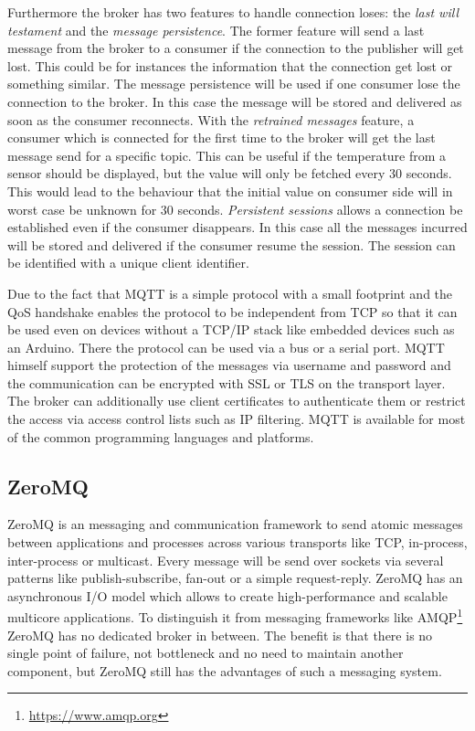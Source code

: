 Furthermore the broker has two features to handle connection loses: the \textit{last will testament} and the \textit{message persistence}.
The former feature will send a last message from the broker to a consumer if the connection to the publisher will get lost.
This could be for instances the information that the connection get lost or something similar.
The message persistence will be used if one consumer lose the connection to the broker.
In this case the message will be stored and delivered as soon as the consumer reconnects.
With the \textit{retrained messages} feature, a consumer which is connected for the first time to the broker will get the last message send for a specific topic. This can be useful if the temperature from a sensor should be displayed, but the value will only be fetched every 30 seconds. This would lead to the behaviour that the initial value on consumer side will in worst case be unknown for 30 seconds.
\textit{Persistent sessions} allows a connection be established even if the consumer disappears. In this case all the messages incurred will be stored and delivered if the consumer resume the session. The session can be identified with a unique client identifier.\autocite[cf.]{Bayer:MQTT}

Due to the fact that \ac{MQTT} is a simple protocol with a small footprint and the \ac{QoS} handshake enables the protocol to be independent from \acs{TCP} so that it can be used even on devices without a TCP/IP stack like embedded devices such as an Arduino.\autocite[cf.]{Bayer:MQTT}
There the protocol can be used via a bus or a serial port.\autocite[cf.]{Bayer:MQTT}
\ac{MQTT} himself support the protection of the messages via username and password and the communication can be encrypted with \acs{SSL} or \acs{TLS} on the transport layer.\autocite[cf.]{Bayer:MQTT}
The broker can additionally use client certificates to authenticate them or restrict the access via access control lists such as \acs{IP} filtering.\autocite[cf.]{Bayer:MQTT}
\ac{MQTT} is available for most of the common programming languages and platforms.


\subsection{ZeroMQ}
\label{section:ZeroMQ}
ZeroMQ is an messaging and communication framework to send atomic messages between applications and processes across various transports like \ac{TCP}, in-process, inter-process or multicast.\autocite[cf.]{ZeroMQ:Guide}
Every message will be send over sockets via several patterns like publish-subscribe, fan-out or a simple request-reply.\autocite[cf.]{ZeroMQ:Guide}
ZeroMQ has an asynchronous I/O model which allows to create high-performance and scalable multicore applications.\autocite[cf.]{ZeroMQ:Guide}
To distinguish it from messaging frameworks like \ac{AMQP}\footnote{\url{https://www.amqp.org}} ZeroMQ has no dedicated broker in between.
The benefit is that there is no single point of failure, not bottleneck and no need to maintain another component, but ZeroMQ still has the advantages of such a messaging system.

